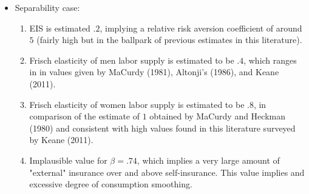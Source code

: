 \documentclass[notes=show]{beamer}
\begin{document}
\bigskip

\begin{frame}%


\begin{itemize}
\item Separability case:

\begin{enumerate}
\item EIS is estimated $.2$, implying a relative risk aversion coefficient
of around $5$ (fairly high but in the ballpark of previous estimates in this
literature).

\item Frisch elasticity of men labor supply is estimated to be $.4$, which
ranges in in values given by MaCurdy (1981), Altonji's (1986), and Keane
(2011).

\item Frisch elasticity of women labor supply is estimated to be $.8$, in
comparison of the estimate of $1$ obtained by MaCurdy and Heckman (1980) and
consistent with high values found in this literature surveyed by Keane
(2011).

\item Implausible value for $\beta =.74$, which implies a very large amount
of "external" insurance over and above self-insurance. This value implies
and excessive degree of consumption smoothing.
\end{enumerate}
\end{itemize}

\transboxout%
\end{frame}%

\bigskip
\end{document}
